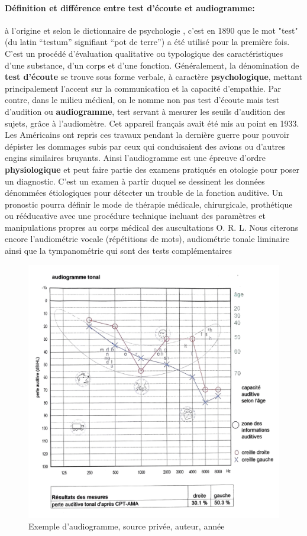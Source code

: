 \paragraph{Définition et différence entre test d'écoute et audiogramme: }
à l'origine et selon le dictionnaire de psychologie \autocite {doronparot}, c'est en 1890 que le mot "test" 
(du latin ``testum''
signifiant ``pot de terre'') a été utilisé pour la
première fois. C'est un procédé d'évaluation qualitative ou
typologique des caractéristiques d'une substance, d'un corps et d'une
fonction.
Généralement, la dénomination de \textbf{test d'écoute} se trouve sous forme verbale,
à caractère
\textbf{psychologique}, mettant principalement l'accent sur la communication
et la capacité d'empathie.
Par contre, dans le milieu médical, on le nomme non pas test d'écoute mais test d'audition ou 
\textbf{audiogramme}, test servant à mesurer les seuils d'audition des sujets, grâce à l'audiomètre. Cet
appareil français avait été mis au point en 1933. Les Américains
ont repris ces travaux pendant la dernière guerre pour pouvoir dépister
les dommages subis par ceux qui conduisaient des avions ou d'autres
engins similaires bruyants.
Ainsi l'audiogramme est une épreuve d'ordre \textbf{physiologique} et peut faire partie des examens  pratiqués en otologie
pour poser un diagnostic.
   C'est un examen à partir duquel se
  dessinent les données dénommées étiologiques
  pour détecter un trouble de la fonction auditive. Un pronostic pourra définir le mode de thérapie
médicale, chirurgicale, prothétique ou rééducative avec une procédure
technique incluant des paramètres et manipulations propres au corps
médical des auscultations O. R. L.
Nous citerons encore l'audiométrie vocale (répétitions de mots), audiométrie tonale liminaire
ainsi que la tympanométrie qui sont des tests 
complémentaires \autocite {audiogramme}

\begin{figure}
	\centering
	\includegraphics[width=0.7\linewidth]{images/graphiques/exempleaudiogramme.png}
	\caption{Exemple d'audiogramme, source privée, auteur, année}
\label{audiogramme}
\end{figure}

